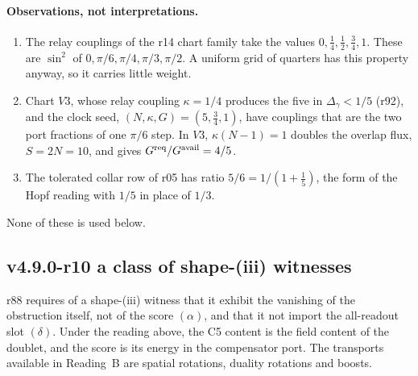 \paragraph{Observations, not interpretations.}
\begin{enumerate}[leftmargin=2em]
\item The relay couplings of the r14 chart family take the values \(0,\tfrac14,\tfrac12,\tfrac34,1\).  These are
\(\sin^2\) of \(0,\pi/6,\pi/4,\pi/3,\pi/2\).  A uniform grid of quarters has this property anyway, so it carries little
weight.
\item Chart \(V3\), whose relay coupling \(\kappa=1/4\) produces the five in \(\Delta_\gamma<1/5\) (r92), and the clock seed,
\((N,\kappa,G)=(5,\tfrac34,1)\), have couplings that are the two port fractions of one \(\pi/6\) step.  In \(V3\),
\(\kappa(N-1)=1\) doubles the overlap flux, \(S=2N=10\), and gives \(G^{\rm req}/G^{\rm avail}=4/5\).
\item The tolerated collar row of r05 has ratio \(5/6=1/(1+\tfrac15)\), the form of the Hopf reading with \(1/5\) in place of
\(1/3\).
\end{enumerate}
None of these is used below.

\subsection*{v4.9.0-r10 a class of shape-(iii) witnesses}
\label{subsec:v490-r10-shape-three}

r88 requires of a shape-(iii) witness that it exhibit the vanishing of the obstruction itself, not of the score
\((\alpha)\), and that it not import the all-readout slot \((\delta)\).  Under the reading above, the C5 content is the field
content of the doublet, and the score is its energy in the compensator port.  The transports available in Reading~B are
spatial rotations, duality rotations and boosts.

